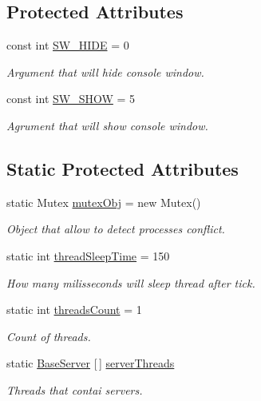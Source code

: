 \subsection*{Protected Attributes}
\begin{DoxyCompactItemize}
\item 
const int \mbox{\hyperlink{class_uniform_server_1_1_base_server_aaff91507b262d2a1b9021caa2d01640f}{S\+W\+\_\+\+H\+I\+DE}} = 0
\begin{DoxyCompactList}\small\item\em Argument that will hide console window. \end{DoxyCompactList}\item 
const int \mbox{\hyperlink{class_uniform_server_1_1_base_server_a494087cabc03c54c3dc0ac1cc1048860}{S\+W\+\_\+\+S\+H\+OW}} = 5
\begin{DoxyCompactList}\small\item\em Agrument that will show console window. \end{DoxyCompactList}\end{DoxyCompactItemize}
\subsection*{Static Protected Attributes}
\begin{DoxyCompactItemize}
\item 
static Mutex \mbox{\hyperlink{class_uniform_server_1_1_base_server_a051bdce3aec037df76d8efe3b9938198}{mutex\+Obj}} = new Mutex()
\begin{DoxyCompactList}\small\item\em Object that allow to detect processes conflict. \end{DoxyCompactList}\item 
static int \mbox{\hyperlink{class_uniform_server_1_1_base_server_a4dbe04636a763decfae22ddb2fe26c7a}{thread\+Sleep\+Time}} = 150
\begin{DoxyCompactList}\small\item\em How many milisseconds will sleep thread after tick. \end{DoxyCompactList}\item 
static int \mbox{\hyperlink{class_uniform_server_1_1_base_server_aa40c02a1eec7eda4c36a8ac08119b414}{threads\+Count}} = 1
\begin{DoxyCompactList}\small\item\em Count of threads. \end{DoxyCompactList}\item 
static \mbox{\hyperlink{class_uniform_server_1_1_base_server}{Base\+Server}} \mbox{[}$\,$\mbox{]} \mbox{\hyperlink{class_uniform_server_1_1_base_server_a3b4049daf3614587c02fb4f1fab870a6}{server\+Threads}}
\begin{DoxyCompactList}\small\item\em Threads that contai servers. \end{DoxyCompactList}\end{DoxyCompactItemize}
